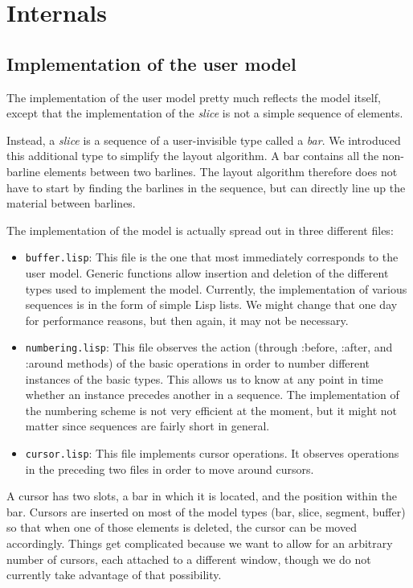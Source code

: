 \part{Internals}

\chapter{Implementation of the user model}

The implementation of the user model pretty much reflects the model
itself, except that the implementation of the \emph{slice} is not a
simple sequence of elements.

Instead, a \emph{slice} is a sequence of a user-invisible type called
a \emph{bar}.  We introduced this additional type to simplify the
layout algorithm.  A bar contains all the non-barline elements
between two barlines.  The layout algorithm therefore does not
have to start by finding the barlines in the sequence, but can
directly line up the material between barlines.

The implementation of the model is actually spread out in three
different files:

\begin{itemize} 
\item \texttt{buffer.lisp}: This file is the one that most immediately
  corresponds to the user model.  Generic functions allow insertion
  and deletion of the different types used to implement the model.
  Currently, the implementation of various sequences is in the form of
  simple Lisp lists.  We might change that one day for performance
  reasons, but then again, it may not be necessary. 
\item \texttt{numbering.lisp}: This file observes the action (through
  :before, :after, and :around methods) of the basic operations in
  order to number different instances of the basic types.  This allows
  us to know at any point in time whether an instance precedes another
  in a sequence.  The implementation of the numbering scheme is not
  very efficient at the moment, but it might not matter since
  sequences are fairly short in general.
\item \texttt{cursor.lisp}: This file implements cursor operations.
  It observes operations in the preceding two files in order to move
  around cursors.  
\end{itemize}

A cursor has two slots, a bar in which it is located, and the position
within the bar.  Cursors are inserted on most of the model types (bar,
slice, segment, buffer) so that when one of those elements is deleted,
the cursor can be moved accordingly.  Things get complicated because
we want to allow for an arbitrary number of cursors, each attached to
a different window, though we do not currently take advantage of that
possibility.

